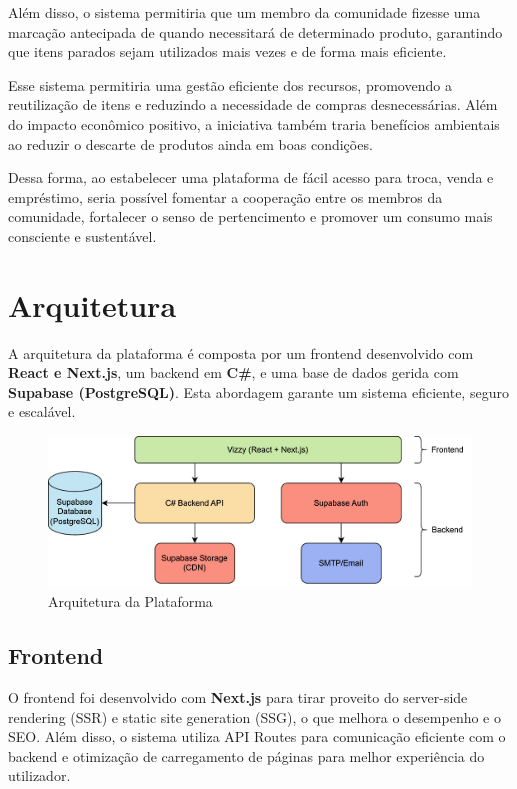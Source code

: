 \documentclass[a4paper, 12pt]{article} %
\begin{document}
Além disso, o sistema permitiria que um membro da comunidade fizesse uma marcação antecipada de quando necessitará de determinado produto, garantindo que itens parados sejam utilizados mais vezes e de forma mais eficiente. 

Esse sistema permitiria uma gestão eficiente dos recursos, promovendo a reutilização de itens e reduzindo a necessidade de compras desnecessárias. Além do impacto econômico positivo, a iniciativa também traria benefícios ambientais ao reduzir o descarte de produtos ainda em boas condições.

Dessa forma, ao estabelecer uma plataforma de fácil acesso para troca, venda e empréstimo, seria possível fomentar a cooperação entre os membros da comunidade, fortalecer o senso de pertencimento e promover um consumo mais consciente e sustentável.


\newpage

\section{Arquitetura}
A arquitetura da plataforma é composta por um frontend desenvolvido com \textbf{React e Next.js}, um backend em \textbf{C\#}, e uma base de dados gerida com \textbf{Supabase (PostgreSQL)}. Esta abordagem garante um sistema eficiente, seguro e escalável.

\begin{figure}[ht]
	\centering
	\includegraphics[width=\textwidth]{system_architecture.png}
	\caption{Arquitetura da Plataforma}
	\label{fig:arquitetura}
\end{figure}

\subsection{Frontend}
O frontend foi desenvolvido com \textbf{Next.js} para tirar proveito do server-side rendering (SSR) e static site generation (SSG), o que melhora o desempenho e o SEO. Além disso, o sistema utiliza API Routes para comunicação eficiente com o backend e otimização de carregamento de páginas para melhor experiência do utilizador.
\end{document}
